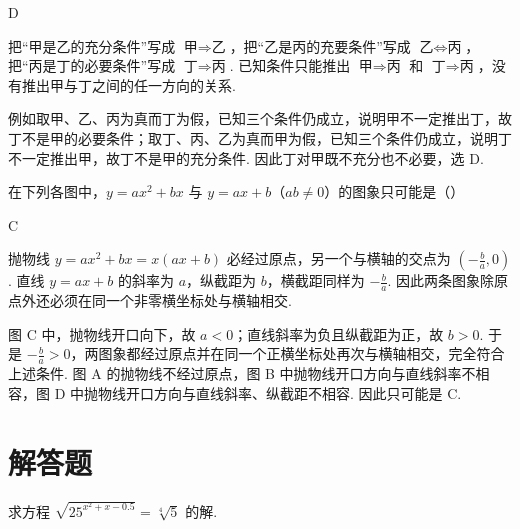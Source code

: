 \begin{answer}
D
\end{answer}

\begin{solution}
把“甲是乙的充分条件”写成 \(\text{甲}\Rightarrow\text{乙}\)，把“乙是丙的充要条件”写成 \(\text{乙}\Leftrightarrow\text{丙}\)，把“丙是丁的必要条件”写成 \(\text{丁}\Rightarrow\text{丙}\). 已知条件只能推出 \(\text{甲}\Rightarrow\text{丙}\) 和 \(\text{丁}\Rightarrow\text{丙}\)，没有推出甲与丁之间的任一方向的关系.

例如取甲、乙、丙为真而丁为假，已知三个条件仍成立，说明甲不一定推出丁，故丁不是甲的必要条件；取丁、丙、乙为真而甲为假，已知三个条件仍成立，说明丁不一定推出甲，故丁不是甲的充分条件. 因此丁对甲既不充分也不必要，选 D.
\end{solution}

\begin{problem}
在下列各图中，\(y = ax^2 + bx\) 与 \(y = ax + b\)（\(ab \neq 0\)）的图象只可能是（\quad）

    {}
    {}
    {}
\end{problem}

\begin{answer}
C
\end{answer}

\begin{solution}
抛物线 \(y=ax^2+bx=x(ax+b)\) 必经过原点，另一个与横轴的交点为 \(\left(-\frac{b}{a},0\right)\). 直线 \(y=ax+b\) 的斜率为 \(a\)，纵截距为 \(b\)，横截距同样为 \(-\frac{b}{a}\). 因此两条图象除原点外还必须在同一个非零横坐标处与横轴相交.

图 C 中，抛物线开口向下，故 \(a<0\)；直线斜率为负且纵截距为正，故 \(b>0\). 于是 \(-\frac{b}{a}>0\)，两图象都经过原点并在同一个正横坐标处再次与横轴相交，完全符合上述条件. 图 A 的抛物线不经过原点，图 B 中抛物线开口方向与直线斜率不相容，图 D 中抛物线开口方向与直线斜率、纵截距不相容. 因此只可能是 C.
\end{solution}

\section{解答题}

\begin{problem}
求方程 \(\sqrt{25^{x^2 + x - 0.5}} = \sqrt[4]{5}\) 的解.
\end{problem}

